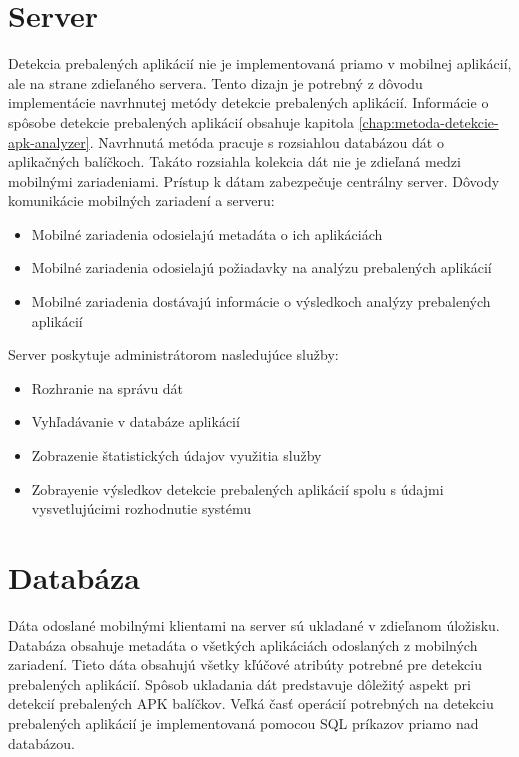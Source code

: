 \section{Server}
Detekcia prebalených aplikácií nie je implementovaná priamo v mobilnej aplikácií, ale na strane zdieľaného servera. Tento dizajn je potrebný z dôvodu implementácie navrhnutej metódy detekcie prebalených aplikácií. Informácie o spôsobe detekcie prebalených aplikácií obsahuje kapitola \ref{chap:metoda-detekcie-apk-analyzer}. Navrhnutá metóda pracuje s rozsiahlou databázou dát o aplikačných balíčkoch. Takáto rozsiahla kolekcia dát nie je zdieľaná medzi mobilnými zariadeniami. Prístup k dátam zabezpečuje centrálny server. 
\newline
\noindent Dôvody komunikácie mobilných zariadení a serveru:
\begin{itemize}
	\item Mobilné zariadenia odosielajú metadáta o ich aplikáciách
	\item Mobilné zariadenia odosielajú požiadavky na analýzu prebalených aplikácií
	\item Mobilné zariadenia dostávajú informácie o výsledkoch analýzy prebalených aplikácií
\end{itemize}
Server poskytuje administrátorom nasledujúce služby:
\begin{itemize}
	\item Rozhranie na správu dát
	\item Vyhľadávanie v databáze aplikácií
	\item Zobrazenie štatistických údajov využitia služby
	\item Zobrayenie výsledkov detekcie prebalených aplikácií spolu s údajmi vysvetlujúcimi rozhodnutie systému
\end{itemize}

\section{Databáza}
Dáta odoslané mobilnými klientami na server sú ukladané v zdieľanom úložisku. Databáza obsahuje metadáta o všetkých aplikáciách odoslaných z mobilných zariadení. Tieto dáta obsahujú všetky kľúčové atribúty potrebné pre detekciu prebalených aplikácií. Spôsob ukladania dát predstavuje dôležitý aspekt pri detekcií prebalených APK balíčkov. Veľká časť operácií potrebných na detekciu prebalených aplikácií je implementovaná pomocou SQL príkazov priamo nad databázou. 
